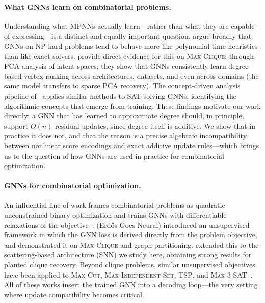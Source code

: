 \documentclass[11pt]{article}
\newcommand{\change}[1]{{\color{red}#1}}
\theoremstyle{plain}
\theoremstyle{definition}
\theoremstyle{remark}
\begin{document}
\paragraph{\change{What GNNs learn on combinatorial problems.}}
\change{Understanding what MPNNs actually learn---rather than what they are capable of expressing---is a distinct and equally important question.} \citet{cappart2023} argue broadly that GNNs on NP-hard problems tend to
behave more like polynomial-time heuristics than like exact solvers.
\citet{shoham2026ltr} provide direct evidence for this on \textsc{Max-Clique}:
through PCA analysis of latent spaces, they show that GNNs consistently learn
degree-based vertex ranking across architectures, datasets, and even across domains
(the same model transfers to sparse PCA recovery). The concept-driven analysis
pipeline of~\citet{shoham2026sat} applies similar methods to SAT-solving GNNs,
identifying the algorithmic concepts that emerge from training. These findings
motivate our work directly: a GNN that has learned to approximate degree should, in
principle, support $O(n)$ residual updates, since degree itself is additive. We show
that in practice it does not, and that the reason is a precise algebraic
incompatibility between nonlinear score encodings and exact additive update rules\change{---which brings us to the question of how GNNs are used in practice for combinatorial optimization}.

\paragraph{GNNs for combinatorial optimization.}
An influential line of work frames
combinatorial problems as quadratic unconstrained binary optimization and trains GNNs
with differentiable relaxations of the
objective~\citep{schuetz2022, karalias2020, min2022}. \citet{karalias2020}
(Erd\H{o}s Goes Neural) introduced an unsupervised framework in which the GNN loss
is derived directly from the problem objective, and demonstrated it on
\textsc{Max-Clique} and graph partitioning. \citet{min2022} extended this to the
scattering-based architecture (SNN) we study here, obtaining strong results for
planted clique recovery. Beyond clique problems, similar unsupervised objectives have
been applied to \textsc{Max-Cut}, \textsc{Max-Independent-Set}, \textsc{TSP}, and
\textsc{Max-3-SAT}~\citep{schuetz2022, garmendia2024}. \change{All of these works
  insert the trained GNN into a decoding loop---the very setting where update
compatibility becomes critical.}
\end{document}

